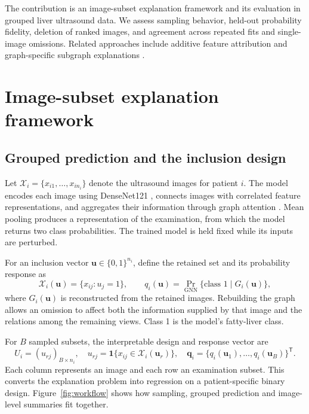 The contribution is an image-subset explanation framework and its evaluation in grouped liver ultrasound data. We assess sampling behavior, held-out probability fidelity, deletion of ranked images, and agreement across repeated fits and single-image omissions. Related approaches include additive feature attribution \citep{lundberg2017shap} and graph-specific subgraph explanations \citep{ying2019gnnexplainer}. 

\section{Image-subset explanation framework}
\subsection{Grouped prediction and the inclusion design}
Let $\mathcal X_i=\{x_{i1},\ldots,x_{in_i}\}$ denote the ultrasound images for patient $i$. The model encodes each image using DenseNet121 \citep{huang2017densenet}, connects images with correlated feature representations, and aggregates their information through graph attention \citep{velickovic2018gat}. Mean pooling produces a representation of the examination, from which the model returns two class probabilities. The trained model is held fixed while its inputs are perturbed.

For an inclusion vector $\boldsymbol u\in\{0,1\}^{n_i}$, define the retained set and its probability response as
\begin{equation}
\mathcal X_i(\boldsymbol u)=\{x_{ij}:u_j=1\},\qquad
q_i(\boldsymbol u)=\Pr_{\mathrm{GNN}}\{\text{class }1\mid G_i(\boldsymbol u)\},
\label{eq:response}
\end{equation}
where $G_i(\boldsymbol u)$ is reconstructed from the retained images. Rebuilding the graph allows an omission to affect both the information supplied by that image and the relations among the remaining views. Class 1 is the model's fatty-liver class.

For $B$ sampled subsets, the interpretable design and response vector are
\begin{equation}
U_i=(u_{rj})_{B\times n_i},\quad
u_{rj}=\mathbf 1\{x_{ij}\in\mathcal X_i(\boldsymbol u_r)\},\quad
\boldsymbol q_i=\{q_i(\boldsymbol u_1),\ldots,q_i(\boldsymbol u_B)\}^{\mathsf T}.
\label{eq:design}
\end{equation}
Each column represents an image and each row an examination subset. This converts the explanation problem into regression on a patient-specific binary design. Figure~\ref{fig:workflow} shows how sampling, grouped prediction and image-level summaries fit together.


